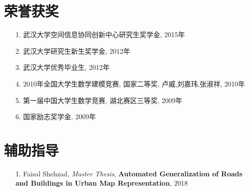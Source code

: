 \documentclass{resume}
\begin{document}
\section{荣誉获奖}
\begin{itemize}[parsep=1.0ex]
  \item[1.] 武汉大学空间信息协同创新中心研究生奖学金, 2015年
  \item[2.] 武汉大学研究生新生奖学金, 2012年
  \item[3.] 武汉大学优秀毕业生, 2012年
  \item[4.] 2010年全国大学生数学建模竞赛, 国家二等奖, 卢威,刘嘉玮,张淑祥, 2010年
  \item[5.] 第一届中国大学生数学竞赛, 湖北赛区三等奖, 2009年
  \item[6.] 国家励志奖学金, 2009年
\end{itemize}

\section{辅助指导}
\begin{itemize}[parsep=1.0ex]
  \item[1.] Faisal Shehzad, \textit{Master Thesis}, \textbf{Automated Generalization of Roads and Buildings in Urban Map Representation}, 2018
\end{itemize}
\end{document}
